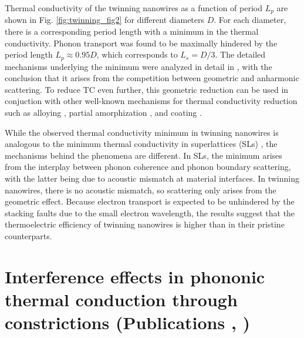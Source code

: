 Thermal conductivity of the twinning nanowires as a function of period $L_p$ are shown in Fig. \ref{fig:twinning_fig2} for different diameters $D$. For each diameter, there is a corresponding period length with a minimum in the thermal conductivity. Phonon transport was found to be maximally hindered by the period length $L_p\approx 0.95D$, which corresponds to $L_s=D/3$. The detailed mechanisms underlying the minimum were analyzed in detail in , with the conclusion that it arises from the competition between geometric and anharmonic scattering. To reduce TC even further, this geometric reduction can be used in conjuction with other well-known mechanisms for thermal conductivity reduction such as alloying \cite{}, partial amorphization \cite{}, and coating \cite{}. %

While the observed thermal conductivity minimum in twinning nanowires is analogous to the minimum thermal conductivity in superlattices (SLs) \cite{simkin00}, the mechanisms behind the phenomena are different. In SLs, the minimum arises from the interplay between phonon coherence and phonon boundary scattering, with the latter being due to acoustic mismatch at material interfaces. In twinning nanowires, there is no acoustic mismatch, so scattering only arises from the geometric effect. Because electron transport is expected to be unhindered by the stacking faults due to the small electron wavelength, the results suggest that the thermoelectric efficiency of twinning nanowires is higher than in their pristine counterparts. %


\section{Interference effects in phononic thermal conduction through constrictions (Publications , )}
\label{sec:results_interference}


